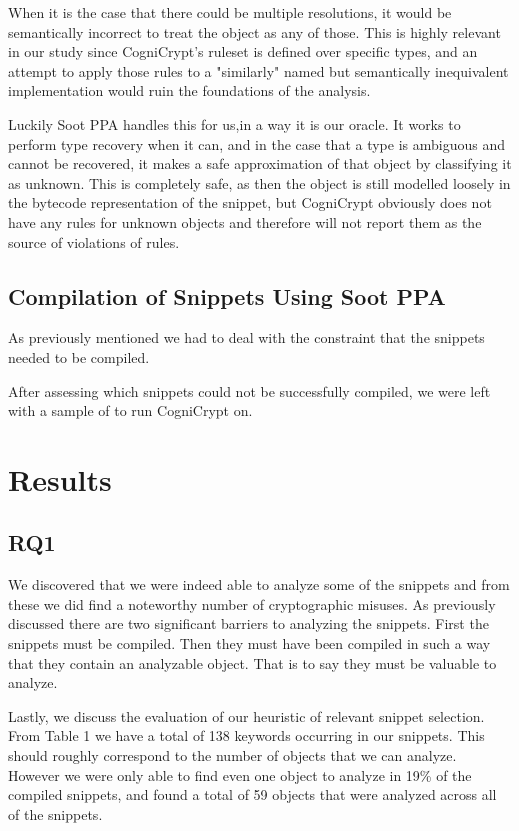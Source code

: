 \documentclass[10pt, conference]{IEEEtran}
\begin{document}
When it is the case that there could be multiple resolutions, it would be semantically incorrect to treat the object as any of those. This is highly relevant in our study since CogniCrypt's ruleset is defined over specific types, and an attempt to apply those rules to a "similarly" named but semantically inequivalent implementation would ruin the foundations of the analysis.

Luckily Soot PPA handles this for us,in a way it is our oracle. It works to perform type recovery when it can, and in the case that a type is ambiguous and cannot be recovered, it makes a safe approximation of that object by classifying it as unknown. This is completely safe, as then the object is still modelled loosely in the bytecode representation of the snippet, but CogniCrypt obviously does not have any rules for unknown objects and therefore will not report them as the source of violations of rules.

\subsection{Compilation of Snippets Using Soot PPA}

As previously mentioned we had to deal with the constraint that the snippets needed to be compiled.

After assessing which snippets could not be successfully compiled, we were left with a sample of to run CogniCrypt on. 

\section{Results}

\subsection{RQ1}

We discovered that we were indeed able to analyze some of the snippets and from these we did find a noteworthy number of cryptographic misuses. As previously discussed there are two significant barriers to analyzing the snippets. First the snippets must be compiled. Then they must have been compiled in such a way that they contain an analyzable object. That is to say they must be valuable to analyze. 

Lastly, we discuss the evaluation of our heuristic of relevant snippet selection. From Table 1 we have a total of 138 keywords occurring in our snippets. This should roughly correspond to the number of objects that we can analyze. However we were only able to find even one object to analyze in 19\% of the compiled snippets, and found a total of 59 objects that were analyzed across all of the snippets. 
\end{document}
